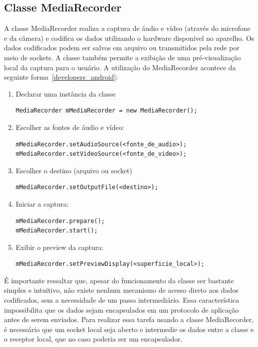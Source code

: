 \documentclass{acm_proc_article-sp}
\begin{document}
\subsection{Classe MediaRecorder}
A classe MediaRecorder realiza a captura de áudio e vídeo (através do microfone e da câmera) e codifica os dados utilizando o hardware disponível no aparelho. Os dados codificados podem ser salvos em arquivo ou transmitidos pela rede por meio de sockets. A classe também permite a exibição de uma pré-visualização local da captura para o usuário. A utilização do MediaRecorder acontece da seguinte forma~\ref{developers_android}:
\begin{enumerate}
 \item Declarar uma instância da classe
  \begin{lstlisting}
MediaRecorder mMediaRecorder = new MediaRecorder();
  \end{lstlisting}
 \item Escolher as fontes de áudio e vídeo:
  \begin{lstlisting}
mMediaRecorder.setAudioSource(<fonte_de_audio>);
mMediaRecorder.setVideoSource(<fonte_de_video>);
  \end{lstlisting}
 \item Escolher o destino (arquivo ou socket)
  \begin{lstlisting}
mMediaRecorder.setOutputFile(<destino>);
  \end{lstlisting}
 \item Iniciar a captura:
  \begin{lstlisting}
mMediaRecorder.prepare();
mMediaRecorder.start();
  \end{lstlisting}
 \item Exibir o preview da captura:
  \begin{lstlisting}
mMediaRecorder.setPreviewDisplay(<superficie_local>);
  \end{lstlisting}
\end{enumerate}

É importante ressaltar que, apesar do funcionamento da classe ser bastante simples e intuitivo, não existe nenhum mecanismo de acesso direto aos dados codificados, sem a necessidade de um passo intermediário. Essa característica impossibilita que os dados sejam encapsulados em um protocolo de aplicação antes de serem enviados. Para realizar essa tarefa usando a classe MediaRecorder, é necessário que um socket local seja aberto e intermedie os dados entre a classe e o receptor local, que no caso poderia ser um encapsulador.
\end{document}
